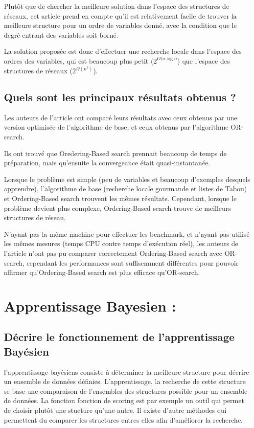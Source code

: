 \documentclass[french,a4paper]{article}
\begin{document}
Plutôt que de chercher la meilleure solution dans l'espace des
structures de réseaux, cet article prend en compte qu'il est
relativement facile de trouver la meilleure structure pour un ordre de
variables donné, avec la condition que le degré entrant des variables
soit borné.

La solution proposée est donc d'effectuer une recherche locale dans
l'espace des ordres des variables, qui est beaucoup plus petit
($2^{O(n \log n}$) que l'espace des structures de réseaux ($2^{\Omega(n^2)}$).

\subsection{Quels sont les principaux résultats obtenus ?}

Les auteurs de l'article ont comparé leurs résultats avec ceux obtenus
par une version optimisée de l'algorithme de base, et ceux obtenus par
l'algorithme OR-search.

Ils ont trouvé que Oredering-Based search prennait beaucoup de temps
de préparation, mais qu'ensuite la convergeance était
quasi-instantanée.

Lorsque le problème est simple (peu de variables et beaucoup
d'exemples desquels apprendre), l'algorithme de base (recherche locale
gourmande et listes de Tabou) et Ordering-Based search trouvent les
mêmes résultats. Cependant, lorsque le problème devient plus complexe,
Ordering-Based search trouve de meilleurs structures de réseau.

N'ayant pas la même machine pour effectuer les benchmark, et n'ayant
pas utilisé les mêmes mesures (temps CPU contre temps d'exécution
réel), les auteurs de l'article n'ont pas pu comparer correctement
Ordering-Based search avec OR-search, cependant les performances sont
suffisemment différentes pour pouvoir affirmer qu'Ordering-Based
search est plus efficace qu'OR-search.

\section{Apprentissage Bayesien :}
\subsection{Décrire le fonctionnement de l'apprentissage Bayésien}
l'apprentissage bayésiens consiste à déterminer la meilleure structure
pour décrire un ensemble de données définies.
L'apprentissage, la recherche de cette structure se base une comparaison
de l'ensembles des structures possible pour un ensemble de données.
La fonction fonction de scoring est par exemple un outil qui permet de
choisir plutôt une stucture qu'une autre. Il existe d'autre méthodes qui
permettent du comparer les structures entres elles afin d'améliorer la recherche.
\end{document}

